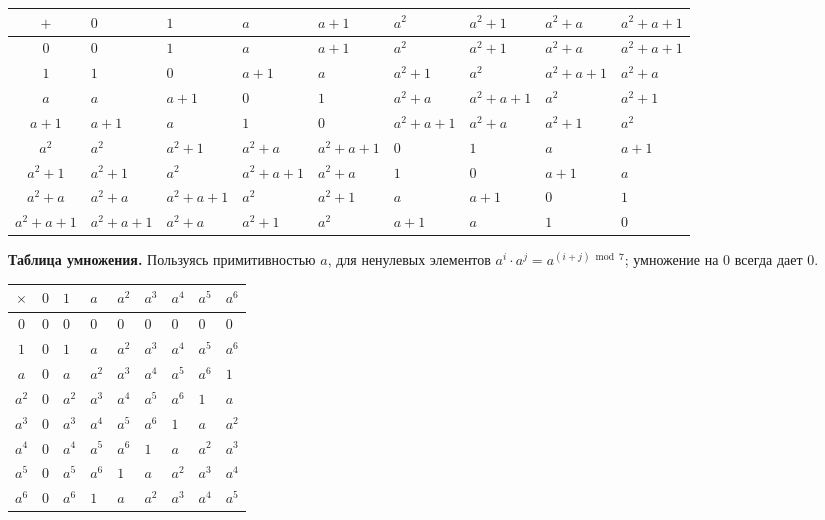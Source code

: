 \documentclass[12pt,a4paper]{article}
\begin{document}
    \begin{center}
    	{\footnotesize
    	\begin{xltabular}{\textwidth}{|c|X|X|X|X|X|X|X|X|}
    		\hline
    		$+$ & $0$ & $1$ & $a$ & $a+1$ & $a^2$ & $a^2+1$ & $a^2+a$ & $a^2+a+1$\\
    		\hline
    		$0$ & $0$ & $1$ & $a$ & $a+1$ & $a^2$ & $a^2+1$ & $a^2+a$ & $a^2+a+1$\\
    		\hline
    		$1$ & $1$ & $0$ & $a+1$ & $a$ & $a^2+1$ & $a^2$ & $a^2+a+1$ & $a^2+a$\\
    		\hline
    		$a$ & $a$ & $a+1$ & $0$ & $1$ & $a^2+a$ & $a^2+a+1$ & $a^2$ & $a^2+1$\\
    		\hline
    		$a+1$ & $a+1$ & $a$ & $1$ & $0$ & $a^2+a+1$ & $a^2+a$ & $a^2+1$ & $a^2$\\
    		\hline
    		$a^2$ & $a^2$ & $a^2+1$ & $a^2+a$ & $a^2+a+1$ & $0$ & $1$ & $a$ & $a+1$\\
    		\hline
    		$a^2+1$ & $a^2+1$ & $a^2$ & $a^2+a+1$ & $a^2+a$ & $1$ & $0$ & $a+1$ & $a$\\
    		\hline
    		$a^2+a$ & $a^2+a$ & $a^2+a+1$ & $a^2$ & $a^2+1$ & $a$ & $a+1$ & $0$ & $1$\\
    		\hline
    		$a^2+a+1$ & $a^2+a+1$ & $a^2+a$ & $a^2+1$ & $a^2$ & $a+1$ & $a$ & $1$ & $0$\\
    		\hline
    	\end{xltabular}
    	}
    \end{center}
    
    \noindent\textbf{Таблица умножения.} Пользуясь примитивностью $a$, для ненулевых элементов $a^i \cdot a^j = a^{(i+j) \bmod 7}$; умножение на $0$ всегда дает $0$.
    
    \begin{center}
    	{\footnotesize
    	\begin{xltabular}{\textwidth}{|c|X|X|X|X|X|X|X|X|}
    		\hline
    		$\times$ & $0$ & $1$ & $a$ & $a^2$ & $a^3$ & $a^4$ & $a^5$ & $a^6$\\
    		\hline
    		$0$ & $0$ & $0$ & $0$ & $0$ & $0$ & $0$ & $0$ & $0$\\
    		\hline
    		$1$ & $0$ & $1$ & $a$ & $a^2$ & $a^3$ & $a^4$ & $a^5$ & $a^6$\\
    		\hline
    		$a$ & $0$ & $a$ & $a^2$ & $a^3$ & $a^4$ & $a^5$ & $a^6$ & $1$\\
    		\hline
    		$a^2$ & $0$ & $a^2$ & $a^3$ & $a^4$ & $a^5$ & $a^6$ & $1$ & $a$\\
    		\hline
    		$a^3$ & $0$ & $a^3$ & $a^4$ & $a^5$ & $a^6$ & $1$ & $a$ & $a^2$\\
    		\hline
    		$a^4$ & $0$ & $a^4$ & $a^5$ & $a^6$ & $1$ & $a$ & $a^2$ & $a^3$\\
    		\hline
    		$a^5$ & $0$ & $a^5$ & $a^6$ & $1$ & $a$ & $a^2$ & $a^3$ & $a^4$\\
    		\hline
    		$a^6$ & $0$ & $a^6$ & $1$ & $a$ & $a^2$ & $a^3$ & $a^4$ & $a^5$\\
    		\hline
    	\end{xltabular}
    	}
    \end{center}
    
\end{document}

